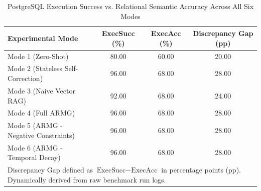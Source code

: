 \begin{table}[h]
\centering
\caption{PostgreSQL Execution Success vs. Relational Semantic Accuracy Across All Six Modes}
\label{tab:gap}
\begin{tabular}{lccc}
\hline
\textbf{Experimental Mode} & \textbf{ExecSucc (\%)} & \textbf{ExecAcc (\%)} & \textbf{Discrepancy Gap (pp)} \\
\hline
Mode 1 (Zero-Shot) & 80.00 & 60.00 & 20.00 \\
Mode 2 (Stateless Self-Correction) & 96.00 & 68.00 & 28.00 \\
Mode 3 (Naive Vector RAG) & 92.00 & 68.00 & 24.00 \\
Mode 4 (Full ARMG) & 96.00 & 68.00 & 28.00 \\
Mode 5 (ARMG - Negative Constraints) & 96.00 & 68.00 & 28.00 \\
Mode 6 (ARMG - Temporal Decay) & 96.00 & 68.00 & 28.00 \\
\hline
\multicolumn{4}{l}{\footnotesize Discrepancy Gap defined as $\text{ExecSucc} - \text{ExecAcc}$ in percentage points (pp). Dynamically derived from raw benchmark run logs.} \\
\end{tabular}
\end{table}
